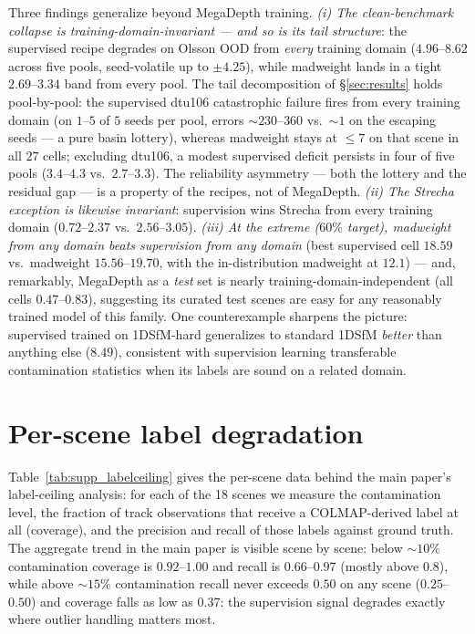 \documentclass{article}
\newcommand{\mad}{madweight}
\begin{document}
Three findings generalize beyond MegaDepth training. \emph{(i) The clean-benchmark
collapse is training-domain-invariant --- and so is its tail structure}: the
supervised recipe degrades on Olsson OOD from \emph{every} training domain
($4.96$--$8.62$ across five pools, seed-volatile up to $\pm4.25$), while \mad{} lands
in a tight $2.69$--$3.34$ band from every pool. The tail decomposition of
\S\ref{sec:results} holds pool-by-pool: the supervised dtu106 catastrophic failure
fires from every training domain (on $1$--$5$ of $5$ seeds per pool, errors
${\sim}230$--$360$ vs.\ ${\sim}1$ on the escaping seeds --- a pure basin lottery),
whereas \mad{} stays at ${\le}7$ on that scene in all $27$ cells; excluding dtu106, a
modest supervised deficit persists in four of five pools ($3.4$--$4.3$ vs.\
$2.7$--$3.3$). The reliability asymmetry --- both the lottery and the residual gap ---
is a property of the recipes, not of MegaDepth. \emph{(ii)
The Strecha exception is likewise invariant}: supervision wins Strecha from every
training domain ($0.72$--$2.37$ vs.\ $2.56$--$3.05$). \emph{(iii) At the extreme
($60\%$ target), \mad{} from any domain beats supervision from any domain} (best
supervised cell $18.59$ vs.\ \mad{} $15.56$--$19.70$, with the in-distribution
\mad{} at $12.1$) --- and, remarkably, MegaDepth as a \emph{test} set is nearly
training-domain-independent (all cells $0.47$--$0.83$), suggesting its curated test
scenes are easy for any reasonably trained model of this family. One
counterexample sharpens the picture: supervised trained on 1DSfM-hard generalizes to
standard 1DSfM \emph{better} than anything else ($8.49$), consistent with supervision
learning transferable contamination statistics when its labels are sound on a related
domain.

\section{Per-scene label degradation}\label{app:labeldeg}
Table~\ref{tab:supp_labelceiling} gives the per-scene data behind the main paper's
label-ceiling analysis: for each of the 18 scenes we measure the contamination level, the
fraction of track observations that receive a COLMAP-derived label at all (coverage), and
the precision and recall of those labels against ground truth. The aggregate trend in the main paper is visible scene by scene: below ${\sim}10\%$ contamination coverage is $0.92$--$1.00$ and recall is $0.66$--$0.97$ (mostly above $0.8$), while above ${\sim}15\%$ contamination recall never exceeds $0.50$ on any scene ($0.25$--$0.50$) and coverage falls as low as $0.37$: the supervision signal degrades exactly where outlier handling matters most.
\end{document}
